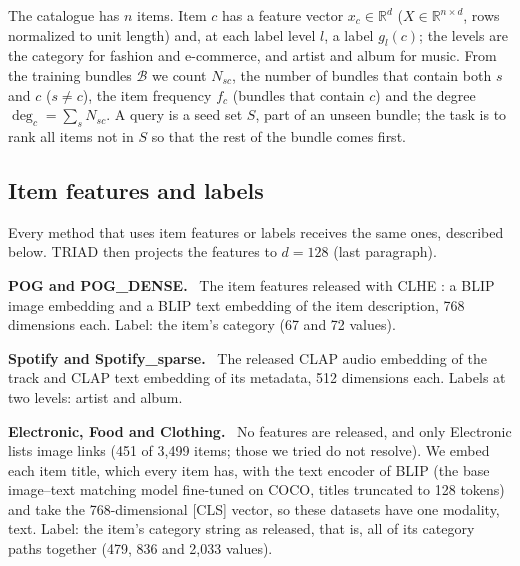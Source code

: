 \documentclass[runningheads]{llncs}
\newcommand{\R}{\mathbb{R}}
\newcommand{\B}{\mathcal{B}}
\renewcommand{\paragraph}[1]{\smallskip\noindent\textbf{#1}\ }
\begin{document}
The catalogue has $n$ items. Item $c$ has a feature vector $x_c\in\R^{d}$ ($X\in\R^{n\times d}$, rows normalized to
unit length) and, at each label level $l$, a label $g_l(c)$; the levels are the category for fashion and e-commerce,
and artist and album for music. From the training bundles $\B$ we count $N_{sc}$, the number of bundles that contain
both $s$ and $c$ ($s\neq c$), the item frequency $f_c$ (bundles that contain $c$) and the degree
$\deg_c=\sum_s N_{sc}$. A query is a seed set $S$, part of an unseen bundle; the task is to rank all items not in
$S$ so that the rest of the bundle comes first.

\subsection{Item features and labels}
\label{sec:features}

Every method that uses item features or labels receives the same ones, described below. TRIAD then projects the
features to $d=128$ (last paragraph).

\paragraph{POG and POG\_DENSE.} The item features released with CLHE \cite{clhe}: a BLIP \cite{blip} image
embedding and a BLIP text embedding of the item description, 768 dimensions each. Label: the item's category (67 and 72 values).

\paragraph{Spotify and Spotify\_sparse.} The released CLAP \cite{clap} audio embedding of the track and CLAP text
embedding of its metadata, 512 dimensions each. Labels at two levels: artist and album.

\paragraph{Electronic, Food and Clothing.} No features are released, and only Electronic lists image links (451 of
3,499 items; those we tried do not resolve). We embed each item title, which every item has, with the text encoder of
BLIP (the base image--text matching model fine-tuned on COCO, titles truncated to 128 tokens) and take the
768-dimensional [CLS] vector, so these datasets have one modality, text. Label: the item's category string as released, that is, all of its
category paths together (479, 836 and 2,033 values).
\end{document}
